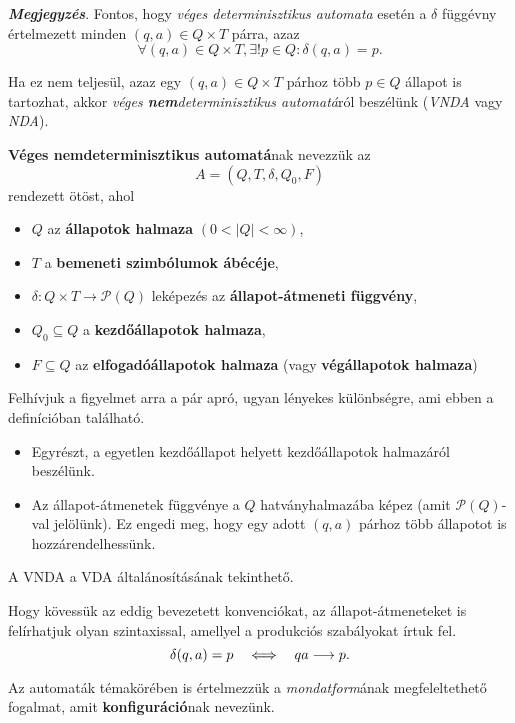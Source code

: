\textbf{\textit{Megjegyzés}}. Fontos, hogy \textit{véges determinisztikus automata} esetén a $\delta$ függévny értelmezett minden $(q,a) \in Q \times T$ párra, azaz
\[ \forall (q,a) \in Q \times T, \exists! p \in Q : \delta(q, a) = p. \]

Ha ez nem teljesül, azaz egy $(q,a)\in Q \times T$ párhoz több $p\in Q$ állapot is tartozhat, akkor \textit{véges \textbf{nem}determinisztikus automatá}ról beszélünk (\textit{VNDA} vagy \textit{NDA}).

\begin{tcolorbox}
	\begin{definition}
		\textbf{Véges nemdeterminisztikus automatá}nak nevezzük az \[ A = (Q, T, \delta, Q_0, F) \] rendezett ötöst, ahol
		\begin{itemize}
			\item $Q$ az \textbf{állapotok halmaza} $(0 < |Q| < \infty)$,
			\item $T$ a \textbf{bemeneti szimbólumok ábécéje},
			\item $\delta : Q \times T \to \mathcal{P}(Q)$ leképezés az \textbf{állapot-átmeneti függvény},
			\item $Q_0 \subseteq Q$ a \textbf{kezdőállapotok halmaza},
			\item $F \subseteq Q$ az \textbf{elfogadóállapotok halmaza} (vagy \textbf{végállapotok halmaza})
		\end{itemize}
	\end{definition}
\end{tcolorbox}

Felhívjuk a figyelmet arra a pár apró, ugyan lényekes különbségre, ami ebben a definícióban található.
\begin{itemize}
	\item Egyrészt, a egyetlen kezdőállapot helyett kezdőállapotok halmazáról beszélünk.
	\item Az állapot-átmenetek függvénye a $Q$ hatványhalmazába képez (amit $\mathcal{P}(Q)$-val jelölünk). Ez engedi meg, hogy egy adott $(q,a)$ párhoz több állapotot is hozzárendelhessünk.
\end{itemize}
A VNDA a VDA általánosításának tekinthető.

Hogy kövessük az eddig bevezetett konvenciókat, az állapot-átmeneteket is felírhatjuk olyan szintaxissal, amellyel a produkciós szabályokat írtuk fel.
\[ \delta(q,a) = p ~~~ \Longleftrightarrow ~~~ qa \longrightarrow p. \]

Az automaták témakörében is értelmezzük a \textit{mondatform}ának megfeleltethető fogalmat, amit \textbf{konfiguráció}nak nevezünk.

